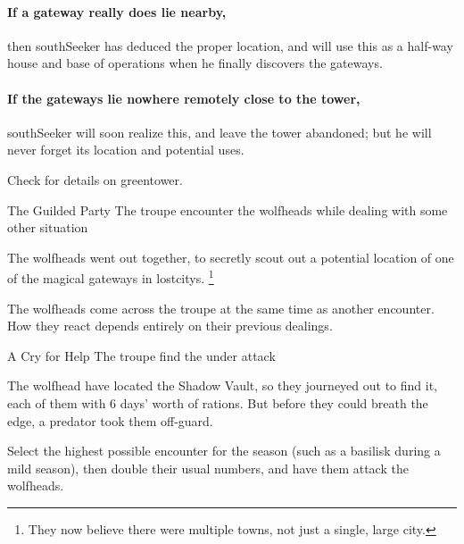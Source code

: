 \paragraph{If a gateway really does lie nearby,}
then \gls{southSeeker} has deduced the proper location, and will use this as a half-way house and base of operations when he finally discovers the gateways.

\paragraph{If the gateways lie nowhere remotely close to the tower,}
\gls{southSeeker} will soon realize this, and leave the tower abandoned; but he will never forget its location and potential uses.

Check  for details on \gls{greentower}.

{\squash The Guilded Party}%
{The troupe encounter the \glspl{wolfhead} while dealing with some other situation}%

\begin{exampletext}
  The \glspl{wolfhead} went out together, to secretly scout out a potential location of one of the magical gateways in \glspl{lostcity}.%
  \footnote{They now believe there were multiple towns, not just a single, large city.}
\end{exampletext}

The \glspl{wolfhead} come across the troupe at the same time as another encounter.
How they react depends entirely on their previous dealings.

{A Cry for Help}%
{The troupe find the  under attack}%

The \gls{wolfhead} have located the Shadow Vault, so they journeyed out to find it, each of them with 6 days' worth of rations.
But before they could breath the \gls{edge}, a predator took them off-guard.

Select the highest possible encounter for the season (such as a basilisk during a mild season), then double their usual numbers, and have them attack the \glspl{wolfhead}.


\ifodd\thepage
\else
    \setcounter{wounds}{5}
    \southSmith
\fi


